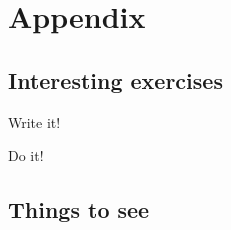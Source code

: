 
\chapter{Appendix}

\section{Interesting exercises}

\begin{exercise!}
Write it!
\end{exercise!}

\begin{solution}
Do it!
\end{solution}

\section{Things to see}
